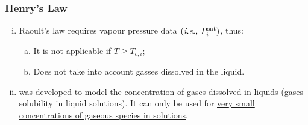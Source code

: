 \documentclass[10pt,compress,handout,ignorenonframetext,unknownkeysallowed]{beamer}
\begin{document}
\begin{frame}
  \frametitle{Henry's Law}
  \begin{enumerate}[i)]
      \item<1-> Raoult's law requires vapour pressure data $\left(\text{{\it i.e., }} P_{i}^{\text{sat}}\right)$, thus:
        \begin{enumerate}[a)]
            \item<1-> It is not applicable if $T\geq T_{c,i}$;
            \item<1-> Does not take into account gasses dissolved in the liquid.
        \end{enumerate}
      \item<2->  was developed to model the concentration of gases dissolved in liquids (\ie gases solubility in liquid solutions). It can only be used for \underline{very small concentrations of gaseous species in solutions}, 
  \end{enumerate}
\end{frame}
\end{document}
